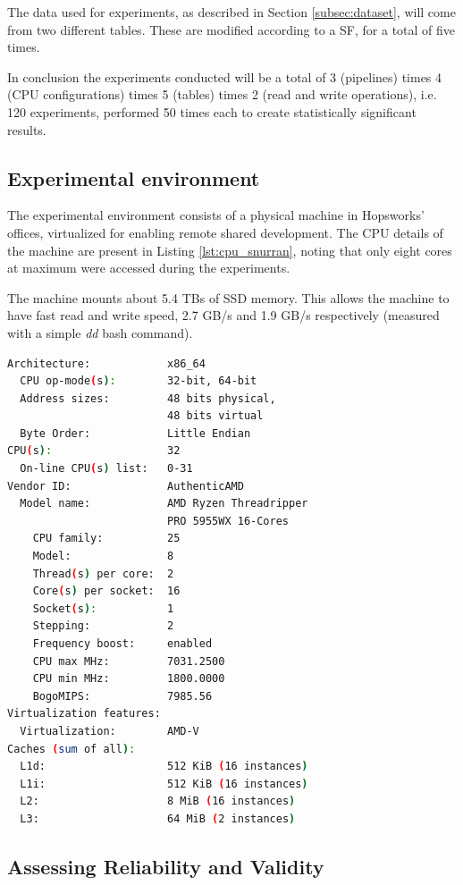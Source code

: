 The data used for experiments, as described in Section \ref{subsec:dataset}, will come from two different tables. These are modified according to a \gls{SF}, for a total of five times.

In conclusion the experiments conducted will be a total of 3 (pipelines) times 4 (\gls{CPU} configurations) times 5 (tables) times 2 (read and write operations), i.e. 120 experiments, performed 50 times each to create statistically significant results.

\subsection{Experimental environment}
The experimental environment consists of a physical machine in Hopsworks' offices, virtualized for enabling remote shared development. The \gls{CPU} details of the machine are present in Listing \ref{lst:cpu_snurran}, noting that only eight cores at maximum were accessed during the experiments.

The machine mounts about 5.4 TBs of \gls{SSD} memory. This allows the machine to have fast read and write speed, 2.7 GB/s and 1.9 GB/s respectively (measured with a simple \textit{dd} bash command).

\begin{lstlisting}[language=bash, caption={Output of a \textit{lscpu} bash command on the test environment.}, label={lst:cpu_snurran}, frame=tb]
Architecture:            x86_64
  CPU op-mode(s):        32-bit, 64-bit
  Address sizes:         48 bits physical, 
                         48 bits virtual
  Byte Order:            Little Endian
CPU(s):                  32
  On-line CPU(s) list:   0-31
Vendor ID:               AuthenticAMD
  Model name:            AMD Ryzen Threadripper 
                         PRO 5955WX 16-Cores
    CPU family:          25
    Model:               8
    Thread(s) per core:  2
    Core(s) per socket:  16
    Socket(s):           1
    Stepping:            2
    Frequency boost:     enabled
    CPU max MHz:         7031.2500
    CPU min MHz:         1800.0000
    BogoMIPS:            7985.56
Virtualization features: 
  Virtualization:        AMD-V
Caches (sum of all):     
  L1d:                   512 KiB (16 instances)
  L1i:                   512 KiB (16 instances)
  L2:                    8 MiB (16 instances)
  L3:                    64 MiB (2 instances)
\end{lstlisting}
\FloatBarrier

\subsection{Assessing Reliability and Validity}

